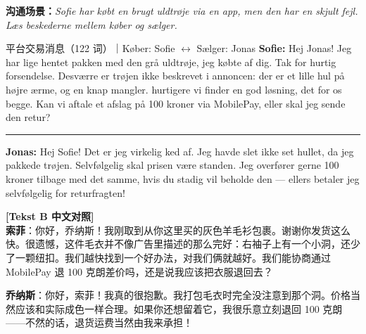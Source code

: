 \textbf{沟通场景：}\textit{Sofie har købt en brugt uldtrøje via en app, men den har en skjult fejl. Læs beskederne mellem køber og sælger.}

\vspace{0.3em}
\begin{emailbox}{平台交易消息（122 词）｜Køber: Sofie \quad $\leftrightarrow$ \quad Sælger: Jonas}
\textbf{Sofie:} Hej Jonas! Jeg har lige hentet pakken med den grå uldtrøje, jeg købte af dig. Tak for hurtig forsendelse. Desværre er trøjen ikke  beskrevet i annoncen: der er et lille hul på højre ærme, og en knap mangler.  hurtigere vi finder en god løsning,  det for os begge. Kan vi aftale et afslag på 100 kroner via MobilePay, eller skal jeg sende den retur?

\vspace{0.35em}
\hrule
\vspace{0.35em}

\textbf{Jonas:} Hej Sofie! Det er jeg virkelig ked af. Jeg havde slet ikke set hullet, da jeg pakkede trøjen. Selvfølgelig skal prisen være  standen. Jeg overfører gerne 100 kroner tilbage med det samme, hvis du stadig vil beholde den --- ellers betaler jeg selvfølgelig for returfragten!
\end{emailbox}

\begin{transbox}
\small
\textbf{\color{NCDTeal}[Tekst B 中文对照]}\\
\textbf{索菲}：你好，乔纳斯！我刚取到从你这里买的灰色羊毛衫包裹。谢谢你发货这么快。很遗憾，这件毛衣并不像广告里描述的那么完好：右袖子上有一个小洞，还少了一颗纽扣。我们越快找到一个好办法，对我们俩就越好。我们能协商通过 MobilePay 退 100 克朗差价吗，还是说我应该把衣服退回去？

\textbf{乔纳斯}：你好，索菲！我真的很抱歉。我打包毛衣时完全没注意到那个洞。价格当然应该和实际成色一样合理。如果你还想留着它，我很乐意立刻退回 100 克朗——不然的话，退货运费当然由我来承担！
\end{transbox}

